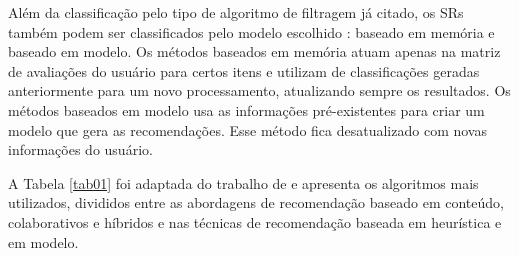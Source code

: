 Além da classificação pelo tipo de algoritmo de filtragem já citado, os SRs também podem 
ser classificados pelo modelo escolhido \cite{bobadilla2013}: baseado em memória e baseado em modelo. 
Os métodos baseados em memória atuam apenas na matriz de avaliações do usuário para certos itens e utilizam de 
classificações geradas anteriormente para um novo processamento, atualizando sempre os resultados. 
Os métodos baseados em modelo usa as informações pré-existentes para criar um
modelo que gera as recomendações. Esse método fica desatualizado com novas informações do usuário.

A Tabela \ref{tab01} foi adaptada do trabalho de  e apresenta os algoritmos mais utilizados, 
divididos entre as abordagens de recomendação baseado em conteúdo, colaborativos e híbridos e nas técnicas 
de recomendação baseada em heurística e em modelo. 

